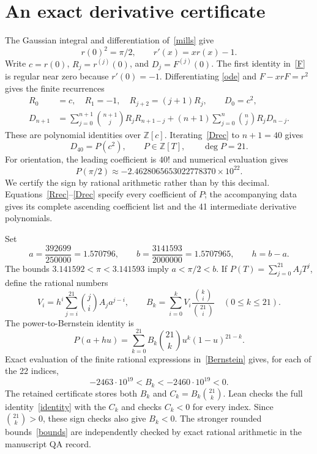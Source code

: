 \documentclass[11pt]{article}
\newcommand{\Z}{\mathbb Z}
\begin{document}
\section{An exact derivative certificate}
The Gaussian integral and differentiation of~\eqref{mills} give
\begin{equation}\label{ode}
 r(0)^2=\pi/2,\qquad r'(x)=xr(x)-1.
\end{equation}
Write $c=r(0)$, $R_j=r^{(j)}(0)$, and $D_j=F^{(j)}(0)$. The first identity
in~\eqref{F} is regular near zero because $r'(0)=-1$. Differentiating
\eqref{ode} and $F-xrF=r^2$ gives the finite recurrences
\begin{align}
 R_0&=c,\quad R_1=-1,\quad R_{j+2}=(j+1)R_j,\qquad D_0=c^2,\label{Rrec}\\
 D_{n+1}&=\sum_{j=0}^{n+1}\binom{n+1}{j}R_jR_{n+1-j}
 +(n+1)\sum_{j=0}^{n}\binom nj R_jD_{n-j}.\label{Drec}
\end{align}
These are polynomial identities over $\Z[c]$. Iterating~\eqref{Drec} to
$n+1=40$ gives
\begin{equation}\label{P}
 D_{40}=P(c^2),\qquad P\in\Z[T],\qquad\deg P=21.
\end{equation}
For orientation, the leading coefficient is $40!$ and numerical evaluation gives
\[
 P(\pi/2)\approx-2.4628065653022778370\times10^{22}.
\]
We certify the sign by rational arithmetic rather than by this decimal.
Equations~\eqref{Rrec}--\eqref{Drec} specify every coefficient of $P$;
the accompanying data gives its complete ascending coefficient list and
the 41 intermediate derivative polynomials.

Set
\[
 a=\frac{392699}{250000}=1.570796,\qquad
 b=\frac{3141593}{2000000}=1.5707965,\qquad h=b-a.
\]
The bounds $3.141592<\pi<3.141593$ imply $a<\pi/2<b$. If
$P(T)=\sum_{j=0}^{21}A_jT^j$, define the rational numbers
\begin{equation}\label{Bernstein}
 V_i=h^i\sum_{j=i}^{21}\binom ji A_ja^{j-i},\qquad
 B_k=\sum_{i=0}^k V_i\frac{\binom ki}{\binom{21}i}
 \quad(0\le k\le21).
\end{equation}
The power-to-Bernstein identity is
\begin{equation}\label{identity}
 P(a+hu)=\sum_{k=0}^{21}B_k\binom{21}k u^k(1-u)^{21-k}.
\end{equation}
Exact evaluation of the finite rational expressions in~\eqref{Bernstein}
gives, for each of the 22 indices,
\begin{equation}\label{bounds}
 -2463\cdot10^{19}<B_k<-2460\cdot10^{19}<0.
\end{equation}
The retained certificate stores both $B_k$ and $C_k=B_k\binom{21}k$.
Lean checks the full identity~\eqref{identity} with the $C_k$ and checks
$C_k<0$ for every index. Since $\binom{21}k>0$, these sign checks also
give $B_k<0$. The stronger rounded bounds~\eqref{bounds} are independently
checked by exact rational arithmetic in the manuscript QA record.
\end{document}
